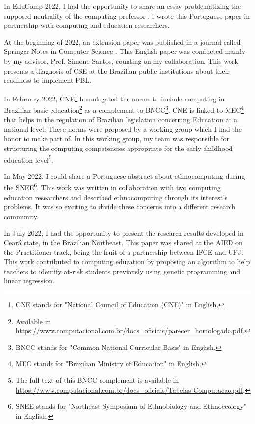 In \gls{EduComp} 2022, I had the opportunity to share an essay problematizing the supposed neutrality of the computing professor \cite{bispojr:2022-educomp}. I wrote this Portuguese paper in partnership with computing and education researchers.

At the beginning of 2022, an extension paper was published in a journal called Springer Notes in Computer Science \cite{santos:2022}. This English paper was conducted mainly by my advisor, Prof. Simone Santos, counting on my collaboration. This work presents a diagnosis of \gls{CSE} at the Brazilian public institutions about their readiness to implement \acrfull{PBL}.

In February 2022, \gls{CNE}\footnote{CNE stands for "National Council of Education (CNE)" in English.} homologated the norms to include computing in Brazilian basic education\footnote{Available in \url{https://www.computacional.com.br/docs_oficiais/parecer_homologado.pdf}.} as a complement to \gls{BNCC}\footnote{BNCC stands for "Common National Curricular Basis" in English.}. \gls{CNE} is linked to \gls{MEC}\footnote{MEC stands for "Brazilian Ministry of Education" in English.} that helps in the regulation of Brazilian legislation concerning Education at a national level. These norms were proposed by a working group which I had the honor to make part of. In this working group, my team was responsible for structuring the computing competencies appropriate for the early childhood education level\footnote{The full text of this \gls{BNCC} complement is available in \url{https://www.computacional.com.br/docs_oficiais/Tabelas-Computacao.pdf}.}.

In May 2022, I could share a Portuguese abstract about ethnocomputing \cite{bispojr:2022-snee} during the \gls{SNEE}\footnote{SNEE stands for "Northeast Symposium of Ethnobiology and Ethnoecology" in English.}. This work was written in collaboration with two computing education researchers and described ethnocomputing through its interest’s problems. It was so exciting to divide these concerns into a different research community.

In July 2022, I had the opportunity to present the research results developed in Ceará state, in the Brazilian Northeast. This paper \cite{esmeraldo:2022} was shared at the \gls{AIED} on the Practitioner track, being the fruit of a partnership between \gls{IFCE} and \gls{UFJ}. This work contributed to computing education by proposing an algorithm to help teachers to identify at-risk students previously using genetic programming and linear regression.

